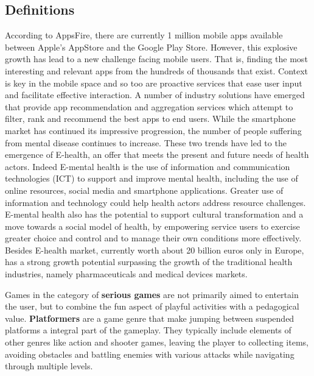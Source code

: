 \documentclass{sigchi}
\begin{document}
\subsection{Definitions}
According to AppsFire, there are currently 1 million mobile apps available between Apple’s AppStore and the Google Play Store. However, this explosive growth has lead to a new challenge facing mobile users. That is, ﬁnding the most interesting and relevant apps from the hundreds of thousands that exist. Context is key in the mobile space and so too are proactive services that ease user input and facilitate effective interaction. A number of industry solutions have emerged that provide app recommendation and aggregation services which attempt to ﬁlter, rank and recommend the best apps to end users.
While the smartphone market has continued its impressive progression, the number of people suffering from mental disease continues to increase. These two trends have led to the emergence of E-health, an offer that meets the present and future needs of health actors. Indeed E-mental health is the use of information and communication technologies (ICT) to support and improve mental health, including the use of online resources, social media and smartphone applications. Greater use of information and technology could help health actors address resource challenges. E-mental health also has the potential to support cultural transformation and a move towards a social model of health, by empowering service users to exercise greater choice and control and to manage their own conditions more effectively. Besides E-health market, currently worth about 20 billion euros only in Europe, has a strong growth potential surpassing the growth of the traditional health industries, namely pharmaceuticals and medical devices markets.
 
Games in the category of \textbf{serious games} are not primarily aimed to entertain the user, but to combine the fun aspect of playful activities with a pedagogical value.
\textbf{Platformers} are a game genre that make jumping between suspended platforms a integral part of the gameplay. They typically include elements of other genres like action and shooter games, leaving the player to collecting items, avoiding obstacles and battling enemies with various attacks while navigating through multiple levels.
\end{document}

